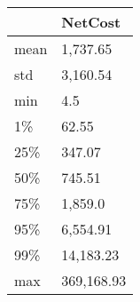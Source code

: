 \begin{tabular}{ll}
\toprule
{} &     NetCost \\
\midrule
mean &    1,737.65 \\
std  &    3,160.54 \\
min  &         4.5 \\
1\%   &       62.55 \\
25\%  &      347.07 \\
50\%  &      745.51 \\
75\%  &     1,859.0 \\
95\%  &    6,554.91 \\
99\%  &   14,183.23 \\
max  &  369,168.93 \\
\bottomrule
\end{tabular}
